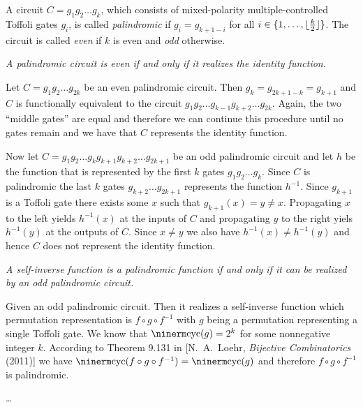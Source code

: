 \medskip {}\enspace A circuit
$C=g_1g_2\dots g_k$, which consists of mixed-polarity multiple-controlled
Toffoli gates $g_i$, is called {\it palindromic\/} if $ g_i = g_{k+1-i}$ for all
$i \in \{1,\dots,\lfloor{k\over 2}\rfloor\}$.  The circuit is called {\it
even\/} if $k$ is even and {\it odd\/} otherwise.

\smallskip {} \sl A palindromic circuit is even if and only
if it realizes the identity function. \rm

\smallskip{} Let $C=g_1g_2\dots g_{2k}$ be an even
palindromic circuit.  Then $g_{k}=g_{2k+1-k}=g_{k+1}$ and $C$ is functionally
equivalent to the circuit $g_1g_2\dots g_{k-1}g_{k+2} \dots g_{2k}$.  Again, the
two ``middle gates'' are equal and therefore we can continue this procedure
until no gates remain and we have that $C$ represents the identity function.

Now let $C=g_1g_2\dots g_kg_{k+1}g_{k+2}\dots g_{2k+1}$ be an odd palindromic
circuit and let $h$ be the function that is represented by the first $k$ gates
$g_1g_2\dots g_k$.  Since $C$ is palindromic the last $k$ gates $g_{k+2}\dots
g_{2k+1}$ represents the function $h^{-1}$.  Since $g_{k+1}$ is a Toffoli gate
there exists some $x$ such that $g_{k+1}(x)=y\neq x$.  Propagating $x$ to the
left yields $h^{-1}(x)$ at the inputs of $C$ and propagating $y$ to the right
yiels $h^{-1}(y)$ at the outputs of $C$.  Since $x\neq y$ we also have
$h^{-1}(x)\neq h^{-1}(y)$ and hence $C$ does not represent the identity
function.\qquad\slug

 \sl A self-inverse function is a palindromic function if
and only if it can be realized by an odd palindromic circuit. \rm

\smallskip{} Given an odd palindromic circuit.  Then it
realizes a self-inverse function which permutation representation is $f\circ
g\circ f^{-1}$ with $g$ being a permutation representing a single Toffoli
gate. We know that ${\rm cyc}(g)=2^k$ for some nonnegative integer $k$.
According to Theorem 9.131 in [N.\ A.\ Loehr, {\sl Bijective Combinatorics\/}
(2011)] we have ${\rm cyc}(f\circ g\circ f^{-1}) = {\rm cyc}(g)$ and therefore
$f\circ g\circ f^{-1}$ is palindromic.

\dots \qquad\slug


